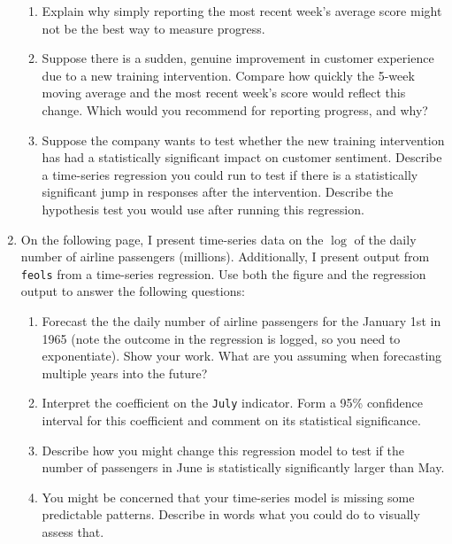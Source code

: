 \documentclass[12pt]{article}
\begin{document}
\begin{enumerate}
  \begin{enumerate}
  \item Explain why simply reporting the most recent week's average score might not be the best way to measure progress.

  \item Suppose there is a sudden, genuine improvement in customer experience due to a new training intervention. Compare how quickly the 5-week moving average and the most recent week's score would reflect this change. Which would you recommend for reporting progress, and why?

  \item Suppose the company wants to test whether the new training intervention has had a statistically significant impact on customer sentiment.
        Describe a time-series regression you could run to test if there is a statistically significant jump in responses after the intervention.
        Describe the hypothesis test you would use after running this regression.
  \end{enumerate}


  \newpage
  \item On the following page, I present time-series data on the $\log$ of the daily number of airline passengers (millions).
  Additionally, I present output from \texttt{feols} from a time-series regression.
  Use both the figure and the regression output to answer the following questions:

  \begin{enumerate}
    \item Forecast the the daily number of airline passengers for the January 1st in 1965 (note the outcome in the regression is logged, so you need to exponentiate). Show your work. What are you assuming when forecasting multiple years into the future?

    \item Interpret the coefficient on the \texttt{July} indicator. Form a 95\% confidence interval for this coefficient and comment on its statistical significance.

    \item Describe how you might change this regression model to test if the number of passengers in June is statistically significantly larger than May.

    \item You might be concerned that your time-series model is missing some predictable patterns. Describe in words what you could do to visually assess that.
  \end{enumerate}
\end{enumerate}
\end{document}

